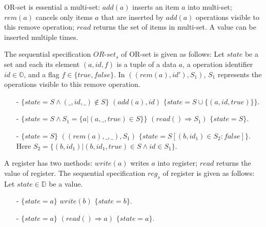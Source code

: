 \begin{example}
\label{definition:sequential specification of or-set}
OR-set is essential a multi-set: $\mathit{add}(a)$ inserts an item $a$ into multi-set; $\mathit{rem}(a)$ cancels only items $a$ that are inserted by $\mathit{add}(a)$ operations visible to this remove operation; $\mathit{read}$ returns the set of items in multi-set. A value can be inserted multiple times.

The sequential specification $\mathit{OR}$-$\mathit{set}_s$ of OR-set is given as follows: Let $\mathit{state}$ be a set and each its element $(a,\mathit{id},f)$ is a tuple of a data $a$, a operation identifier $\mathit{id} \in \mathbb{O}$, and a flag $f \in \{ \mathit{true},\mathit{false} \}$. In $((rem(a),\mathit{id}'),S_1)$, $S_1$ represents the operations visible to this remove operation.
\begin{itemize}
\setlength{\itemsep}{0.5pt}
\item[-] $\{ \mathit{state} = S  \wedge (\_,\mathit{id},\_) \notin S \}$ $(\mathit{add}(a),\mathit{id})$ $\{ \mathit{state} = S \cup \{ (a,\mathit{id},\mathit{true}) \} \}$.
\item[-] $\{ \mathit{state} = S \wedge S_1 = \{ a \vert (a,\_,\mathit{true}) \in S \} \}$ $(\mathit{read}() \Rightarrow S_1)$ $\{ \mathit{state} = S \}$.
\item[-] $\{ \mathit{state} = S \}$ $((rem(a),\_,\_),S_1)$ $\{ \mathit{state} = S[(b,\mathit{id}_1) \in S_2 : \mathit{false}] \}$. Here $S_2 = \{ (b,\mathit{id}_1) \vert (b,\mathit{id}_1,\mathit{true}) \in S \wedge id \in S_1 \}$.
\end{itemize}
\end{example}


\begin{example}
\label{definition:sequential specification of register}
A register has two methods: $\mathit{write}(a)$ writes $a$ into register; $\mathit{read}$ returns the value of register. The sequential specification $\mathit{reg}_s$ of register is given as follows: Let $\mathit{state} \in \mathbb{D}$ be a value.
\begin{itemize}
\setlength{\itemsep}{0.5pt}
\item[-] $\{ \mathit{state} = a  \}$ $\mathit{write}(b)$ $\{ \mathit{state} = b \}$.
\item[-] $\{ \mathit{state} = a \}$ $(\mathit{read}() \Rightarrow a)$ $\{ \mathit{state} = a \}$.
\end{itemize}
\end{example}





